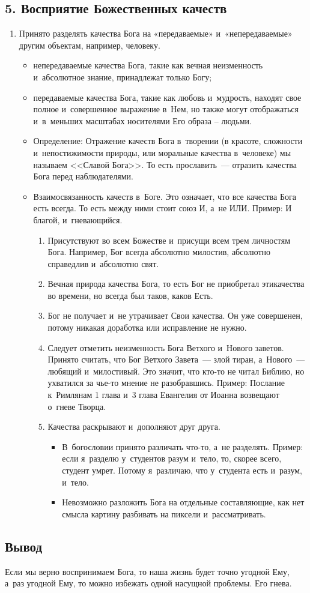 \documentclass[a4paper,12pt]{article}
\begin{document}
\subsection{5. Восприятие Божественных качеств}
\begin{enumerate}
    \item Принято разделять качества Бога на «передаваемые» и~«непередаваемые» другим объектам, например, человеку.
    \begin{itemize}
        \item непередаваемые качества Бога, такие как вечная неизменность и~абсолютное знание, принадлежат только Богу;
        \item передаваемые качества Бога, такие как любовь и~мудрость, находят свое полное и~совершенное выражение в~Нем, но также могут отображаться и~в~меньших масштабах носителями Его образа – людьми. 
        \item Определение: Отражение качеств Бога в~творении (в красоте, сложности и~непостижимости природы, или моральные качества в~человеке) мы называем <<Славой Бога>>. То есть прославить~--- отразить качества Бога перед наблюдателями.
    \item Взаимосвязанность качеств в~Боге. Это означает, что все качества Бога есть всегда. То есть между ними стоит союз И, а~не ИЛИ. Пример: И благой, и~гневающийся.


    \begin{enumerate}
        \item Присутствуют во всем Божестве и~присущи всем трем личностям Бога. Например, Бог всегда абсолютно милостив, абсолютно справедлив и~абсолютно свят.
        \item Вечная природа качества Бога, то есть Бог не приобретал этикачества во времени, но всегда был таков, каков Есть.
        \item Бог не получает и~не утрачивает Свои качества. Он уже совершенен, потому никакая доработка или исправление не нужно.
        \item Следует отметить неизменность Бога Ветхого и~Нового заветов. Принято считать, что Бог Ветхого Завета~--- злой тиран, а~Нового~--- любящий и~милостивый. Это значит, что кто-то не читал Библию, но ухватился за чье-то мнение не разобравшись. Пример: Послание к~Римлянам 1 глава и~3 глава Евангелия от Иоанна возвещают о~гневе Творца.
        \item Качества раскрывают и~дополняют друг друга.
        \begin{itemize}
            \item В~богословии принято различать что-то, а~не разделять. Пример: если я~разделю у~студентов разум и~тело, то, скорее всего, студент умрет. Потому я~различаю, что у~студента есть и~разум, и~тело.
            \item Невозможно разложить Бога на отдельные составляющие, как нет смысла картину разбивать на пиксели и~рассматривать.
        \end{itemize}
    \end{enumerate}
    \end{itemize}
\end{enumerate}

\subsection{Вывод}

Если мы верно воспринимаем Бога, то наша жизнь будет точно угодной Ему, а~раз угодной Ему, то можно избежать одной насущной проблемы. Его гнева.
\end{document}

